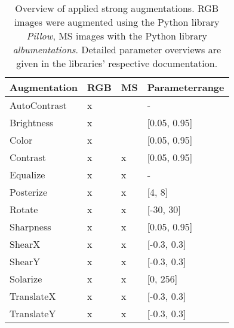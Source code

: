 \documentclass[journal]{IEEEtran}
\begin{document}
\begin{table}
\caption{Overview of applied strong augmentations. RGB images were augmented using the Python library \textit{Pillow}, MS images with the Python library \textit{albumentations}. Detailed parameter overviews are given in the libraries' respective documentation. \label{table:aug}}
\begin{center}
 {\tabulinesep=0.5mm
\setlength\tabcolsep{2pt}
\begin{tabu} {|X[0.5]|| X[0.25c] | X[0.25c] | X[1c]|}
 \hline
  Augmentation & RGB & MS & Parameterrange \\
 \hline
AutoContrast    & x & &     -                 \\ \hline
Brightness      & x & &     [0.05, 0.95]      \\ \hline
Color           & x & &     [0.05, 0.95]      \\ \hline
Contrast        & x & x &   [0.05, 0.95]      \\ \hline
Equalize        & x & x &   -                 \\ \hline
Posterize       & x & x &   [4, 8]            \\ \hline
Rotate          & x & x &   [-30, 30]         \\ \hline
Sharpness       & x & x &   [0.05, 0.95]      \\ \hline
ShearX          & x & x &   [-0.3, 0.3]       \\ \hline
ShearY          & x & x &   [-0.3, 0.3]       \\ \hline
Solarize        & x & x &   [0, 256]          \\ \hline
TranslateX      & x & x &   [-0.3, 0.3]       \\ \hline
TranslateY      & x & x &   [-0.3, 0.3]       \\ \hline
\end{tabu}}
\label{table:augmentations}
\end{center}
\end{table}
\end{document}
